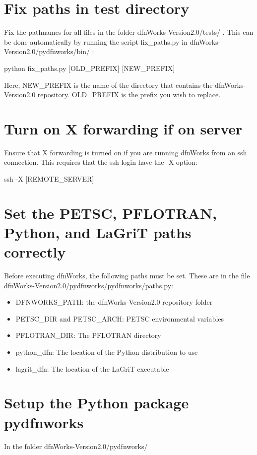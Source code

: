 \documentclass[letterpaper,10pt,english]{sphinxmanual}
\begin{document}
\section{Fix paths in test directory}
\label{examples:fix-paths-in-test-directory}
Fix the pathnames for all files in the folder dfnWorks-Version2.0/tests/ . This can be done automatically by running the script fix\_paths.py in dfnWorks-Version2.0/pydfnworks/bin/ :

python fix\_paths.py {[}OLD\_PREFIX{]} {[}NEW\_PREFIX{]}

Here, NEW\_PREFIX is the name of the directory that contains the dfnWorks-Version2.0 repository. OLD\_PREFIX is the prefix you wish to replace.


\section{Turn on X forwarding if on server}
\label{examples:turn-on-x-forwarding-if-on-server}
Ensure that X forwarding is turned on if you are running dfnWorks from an ssh connection. This requires that the ssh login have the -X option:

ssh -X {[}REMOTE\_SERVER{]}


\section{Set the PETSC, PFLOTRAN, Python, and LaGriT paths correctly}
\label{examples:set-the-petsc-pflotran-python-and-lagrit-paths-correctly}
Before executing dfnWorks, the following paths must be set. These are in the file dfnWorks-Version2.0/pydfnworks/pydfnworks/paths.py:
\begin{itemize}
\item {} 
DFNWORKS\_PATH: the dfnWorks-Version2.0 repository folder

\item {} 
PETSC\_DIR and PETSC\_ARCH: PETSC environmental variables

\item {} 
PFLOTRAN\_DIR: The PFLOTRAN directory

\item {} 
python\_dfn: The location of the Python distribution to use

\item {} 
lagrit\_dfn: The location of the LaGriT executable

\end{itemize}


\section{Setup the Python package pydfnworks}
\label{examples:setup-the-python-package-pydfnworks}
In the folder dfnWorks-Version2.0/pydfnworks/
\end{document}
